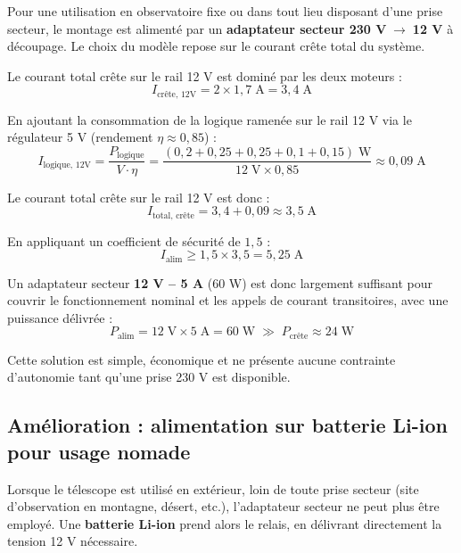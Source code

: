 \documentclass[12pt,a4paper]{report}
\begin{document}
\begin{enumerate}
Pour une utilisation en observatoire fixe ou dans tout lieu disposant d'une prise
secteur, le montage est alimenté par un \textbf{adaptateur secteur 230 V$\;\to\;$12 V}
à découpage. Le choix du modèle repose sur le courant crête total du système.

Le courant total crête sur le rail 12 V est dominé par les deux moteurs :
\begin{equation}
    I_{\text{crête, 12V}} = 2 \times 1{,}7\;\text{A} = 3{,}4\;\text{A}
\end{equation}

En ajoutant la consommation de la logique ramenée sur le rail 12 V via le
régulateur 5 V (rendement $\eta \approx 0{,}85$) :
\begin{equation}
    I_{\text{logique, 12V}} = \frac{P_{\text{logique}}}{V \cdot \eta}
    = \frac{(0{,}2 + 0{,}25 + 0{,}25 + 0{,}1 + 0{,}15)\;\text{W}}{12\;\text{V}
    \times 0{,}85} \approx 0{,}09\;\text{A}
\end{equation}

Le courant total crête sur le rail 12 V est donc :
\begin{equation}
    I_{\text{total, crête}} = 3{,}4 + 0{,}09 \approx 3{,}5\;\text{A}
\end{equation}

En appliquant un coefficient de sécurité de $1{,}5$ :
\begin{equation}
    I_{\text{alim}} \geq 1{,}5 \times 3{,}5 = 5{,}25\;\text{A}
\end{equation}

Un adaptateur secteur \textbf{12 V -- 5 A} (60 W) est donc largement suffisant
pour couvrir le fonctionnement nominal et les appels de courant transitoires, avec
une puissance délivrée :
\begin{equation}
    P_{\text{alim}} = 12\;\text{V} \times 5\;\text{A} = 60\;\text{W}
    \;\gg\; P_{\text{crête}} \approx 24\;\text{W}
\end{equation}

Cette solution est simple, économique et ne présente aucune contrainte d'autonomie
tant qu'une prise 230 V est disponible.

\subsection{Amélioration : alimentation sur batterie Li-ion pour usage nomade}

Lorsque le télescope est utilisé en extérieur, loin de toute prise secteur (site
d'observation en montagne, désert, etc.), l'adaptateur secteur ne peut plus être
employé. Une \textbf{batterie Li-ion} prend alors le relais, en délivrant
directement la tension 12 V nécessaire.


\end{enumerate}
\end{document}
